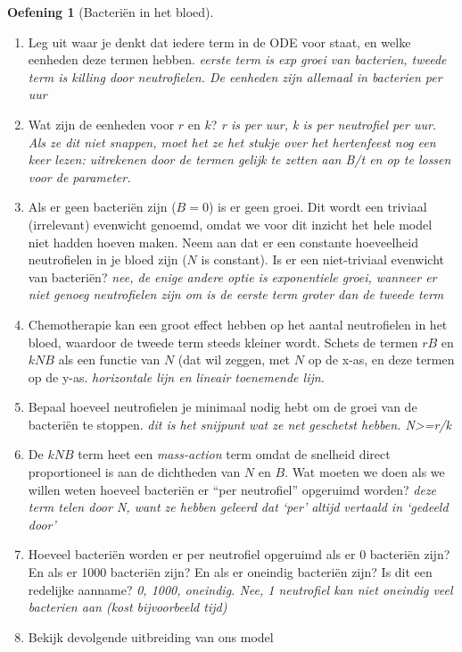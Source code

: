 \documentclass[
  a4paper,
]{scrbook}
\providecommand{\tightlist}{%
  \setlength{\itemsep}{0pt}\setlength{\parskip}{0pt}}\usepackage{longtable,booktabs,array}
\theoremstyle{definition}
\newtheorem{exercise}{Oefening}[chapter]
\theoremstyle{remark}
\begin{document}
\begin{exercise}[Bacteriën in het
bloed]
\begin{enumerate}
\def\labelenumi{\alph{enumi}.}
\tightlist
\item
  Leg uit waar je denkt dat iedere term in de ODE voor staat, en welke
  eenheden deze termen hebben. \emph{eerste term is exp groei van
  bacterien, tweede term is killing door neutrofielen. De eenheden zijn
  allemaal in bacterien per uur}
\item
  Wat zijn de eenheden voor \(r\) en \(k\)? \emph{r is per uur, k is per
  neutrofiel per uur. Als ze dit niet snappen, moet het ze het stukje
  over het hertenfeest nog een keer lezen: uitrekenen door de termen
  gelijk te zetten aan B/t en op te lossen voor de parameter.}
\item
  Als er geen bacteriën zijn (\(B=0\)) is er geen groei. Dit wordt een
  triviaal (irrelevant) evenwicht genoemd, omdat we voor dit inzicht het
  hele model niet hadden hoeven maken. Neem aan dat er een constante
  hoeveelheid neutrofielen in je bloed zijn (\(N\) is constant). Is er
  een niet-triviaal evenwicht van bacteriën? \emph{nee, de enige andere
  optie is exponentiele groei, wanneer er niet genoeg neutrofielen zijn
  om is de eerste term groter dan de tweede term}
\item
  Chemotherapie kan een groot effect hebben op het aantal neutrofielen
  in het bloed, waardoor de tweede term steeds kleiner wordt. Schets de
  termen \(rB\) en \(kNB\) als een functie van \(N\) (dat wil zeggen,
  met \(N\) op de x-as, en deze termen op de y-as. \emph{horizontale
  lijn en lineair toenemende lijn.}
\item
  Bepaal hoeveel neutrofielen je minimaal nodig hebt om de groei van de
  bacteriën te stoppen. \emph{dit is het snijpunt wat ze net geschetst
  hebben. N\textgreater=r/k}
\item
  De \(kNB\) term heet een \emph{mass-action} term omdat de snelheid
  direct proportioneel is aan de dichtheden van \(N\) en \(B\). Wat
  moeten we doen als we willen weten hoeveel bacteriën er ``per
  neutrofiel'' opgeruimd worden? \emph{deze term telen door N, want ze
  hebben geleerd dat `per' altijd vertaald in `gedeeld door'}
\item
  Hoeveel bacteriën worden er per neutrofiel opgeruimd als er 0
  bacteriën zijn? En als er 1000 bacteriën zijn? En als er oneindig
  bacteriën zijn? Is dit een redelijke aanname? \emph{0, 1000, oneindig.
  Nee, 1 neutrofiel kan niet oneindig veel bacterien aan (kost
  bijvoorbeeld tijd)}
\item
  Bekijk devolgende uitbreiding van ons model

\end{enumerate}
\end{exercise}
\end{document}
